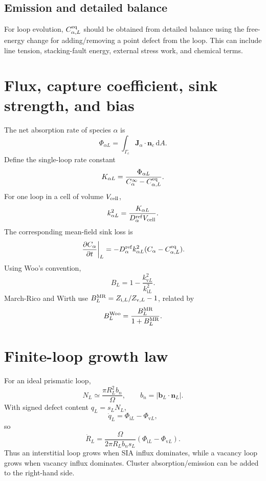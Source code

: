 \documentclass[11pt]{article}
\newcommand{\dd}{\mathrm{d}}
\newcommand{\ii}{\mathrm i}
\newcommand{\vv}{\mathrm v}
\newcommand{\bJ}{\bm{J}}
\newcommand{\bn}{\bm{n}}
\newcommand{\bb}{\bm{b}}
\newcommand{\cG}{\Gamma}
\begin{document}
\subsection{Emission and detailed balance}
For loop evolution, $C_{\alpha,L}^{\rm eq}$ should be obtained from detailed balance using the free-energy change for adding/removing a point defect from the loop. This can include line tension, stacking-fault energy, external stress work, and chemical terms.

\section{Flux, capture coefficient, sink strength, and bias}
The net absorption rate of species $\alpha$ is
\begin{equation}
\boxed{\Phi_{\alpha L}=\int_{\cG_c}\bJ_\alpha\cdot\bn_c\,\dd A}.
\end{equation}
Define the single-loop rate constant
\begin{equation}
K_{\alpha L}=\frac{\Phi_{\alpha L}}{C_\alpha^\infty-C_{\alpha,L}^{\rm eq}}.
\end{equation}
For one loop in a cell of volume $V_{\rm cell}$,
\begin{equation}
k_{\alpha L}^2=\frac{K_{\alpha L}}{D_\alpha^{\rm ref}V_{\rm cell}}.
\end{equation}
The corresponding mean-field sink loss is
\begin{equation}
\left.\frac{\partial C_\alpha}{\partial t}\right|_L=-D_\alpha^{\rm ref}k_{\alpha L}^2(C_\alpha-C_{\alpha,L}^{\rm eq}).
\end{equation}
Using Woo's convention,
\begin{equation}
\boxed{B_L=1-\frac{k_{\vv L}^2}{k_{\ii L}^2}}.
\end{equation}
March-Rico and Wirth use $B_L^{\rm MR}=Z_{\ii,L}/Z_{\vv,L}-1$, related by
\begin{equation}
B_L^{\rm Woo}=\frac{B_L^{\rm MR}}{1+B_L^{\rm MR}}.
\end{equation}

\section{Finite-loop growth law}
For an ideal prismatic loop,
\begin{equation}
N_L\simeq\frac{\pi R_L^2 b_n}{\Omega},\qquad b_n=|\bb_L\cdot\bn_L|.
\end{equation}
With signed defect content $q_L=s_LN_L$,
\begin{equation}
\dot q_L=\Phi_{\ii L}-\Phi_{\vv L},
\end{equation}
so
\begin{equation}
\boxed{\dot R_L=\frac{\Omega}{2\pi R_Lb_ns_L}(\Phi_{\ii L}-\Phi_{\vv L})}.
\end{equation}
Thus an interstitial loop grows when SIA influx dominates, while a vacancy loop grows when vacancy influx dominates. Cluster absorption/emission can be added to the right-hand side.
\end{document}

